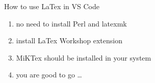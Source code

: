 \documentclass[20pt]{extbook}
\begin{document}
    How to use LaTex in VS Code
    \begin{enumerate}
        \item no need to install Perl and latexmk
        \item install LaTex Workshop extension
        \item MiKTex should be installed in your system 
        \item you are good to go \dots
    \end{enumerate}
\end{document}
